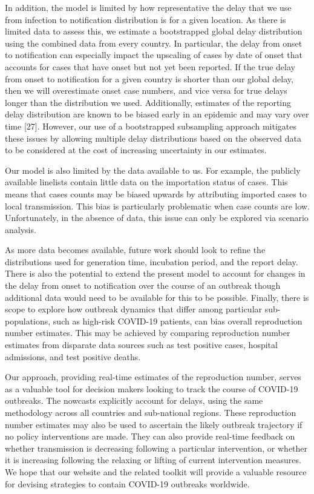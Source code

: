 \documentclass[
]{article}
\begin{document}
In addition, the model is limited by how representative the delay that
we use from infection to notification distribution is for a given
location. As there is limited data to assess this, we estimate a
bootstrapped global delay distribution using the combined data from
every country. In particular, the delay from onset to notification can
especially impact the upscaling of cases by date of onset that accounts
for cases that have onset but not yet been reported. If the true delay
from onset to notification for a given country is shorter than our
global delay, then we will overestimate onset case numbers, and vice
versa for true delays longer than the distribution we used.
Additionally, estimates of the reporting delay distribution are known to
be biased early in an epidemic and may vary over time {[}27{]}. However,
our use of a bootstrapped subsampling approach mitigates these issues by
allowing multiple delay distributions based on the observed data to be
considered at the cost of increasing uncertainty in our estimates.

Our model is also limited by the data available to us. For example, the
publicly available linelists contain little data on the importation
status of cases. This means that cases counts may be biased upwards by
attributing imported cases to local transmission. This bias is
particularly problematic when case counts are low. Unfortunately, in the
absence of data, this issue can only be explored via scenario analysis.

As more data becomes available, future work should look to refine the
distributions used for generation time, incubation period, and the
report delay. There is also the potential to extend the present model to
account for changes in the delay from onset to notification over the
course of an outbreak though additional data would need to be available
for this to be possible. Finally, there is scope to explore how outbreak
dynamics that differ among particular sub-populations, such as high-risk
COVID-19 patients, can bias overall reproduction number estimates. This
may be achieved by comparing reproduction number estimates from
disparate data sources such as test positive cases, hospital admissions,
and test positive deaths.

Our approach, providing real-time estimates of the reproduction number,
serves as a valuable tool for decision makers looking to track the
course of COVID-19 outbreaks. The nowcasts explicitly account for
delays, using the same methodology across all countries and sub-national
regions. These reproduction number estimates may also be used to
ascertain the likely outbreak trajectory if no policy interventions are
made. They can also provide real-time feedback on whether transmission
is decreasing following a particular intervention, or whether it is
increasing following the relaxing or lifting of current intervention
measures. We hope that our website and the related toolkit will provide
a valuable resource for devising strategies to contain COVID-19
outbreaks worldwide.
\end{document}
